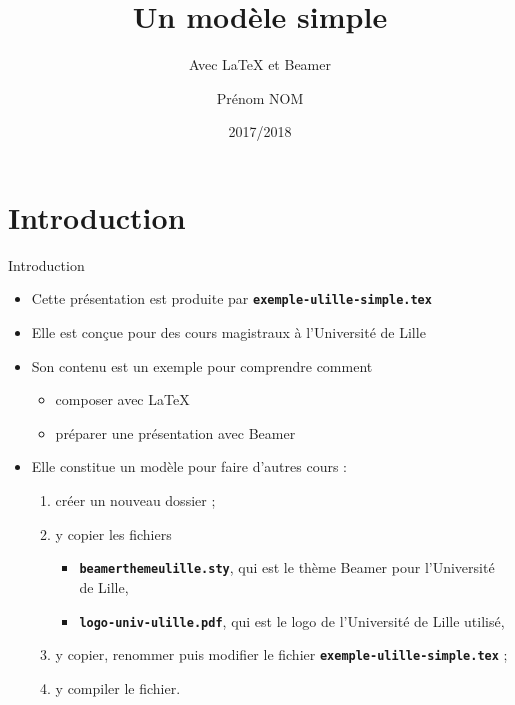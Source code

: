 \documentclass[10pt,t]{beamer}
\title{Un modèle simple}
\subtitle{Avec \LaTeX{} et Beamer}
\author{Prénom NOM}
\institute[]{Université de Lille}
\date{2017/2018}
\begin{document}
\maketitle


\section{Introduction}

\begin{frame}{Introduction} 

  \begin{itemize}
  \item Cette présentation est produite par \texttt{\textbf{exemple-ulille-simple.tex}}
  \item Elle est conçue pour des cours magistraux à l'Université de Lille
  \item Son contenu est un exemple pour comprendre comment

    \begin{itemize}
    \item composer avec \LaTeX{}
    \item préparer une présentation avec Beamer
    \end{itemize}

  \end{itemize}

  \pause


  \begin{itemize}
  \item Elle constitue un modèle pour faire d'autres cours :
      
    \begin{enumerate}
    \item créer un nouveau dossier ;
    \item y copier les fichiers 
      
      \begin{itemize}
      \item \texttt{\textbf{beamerthemeulille.sty}}, qui est le thème Beamer pour l'Université de Lille,
      \item \texttt{\textbf{logo-univ-ulille.pdf}}, qui est le logo de l'Université de Lille utilisé,
      \end{itemize}
      
    \item y copier, renommer puis modifier le fichier \texttt{\textbf{exemple-ulille-simple.tex}} ;
    \item y compiler le fichier.
    \end{enumerate}
  \end{itemize}
\end{frame}
\end{document}
